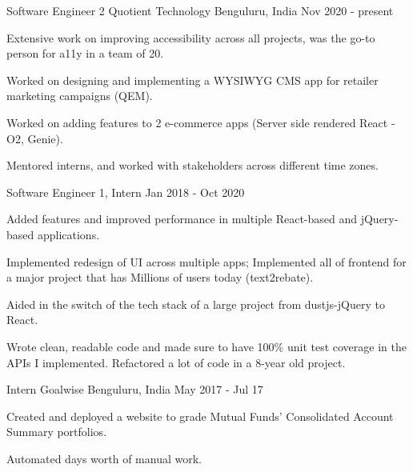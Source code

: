
\begin{cventries}
	\cventrytwopositions
	{Software Engineer 2}
	{Quotient Technology}
	{Benguluru, India}
	{Nov 2020 - present}
	{
		\begin{cvitems}
			\item {Extensive work on improving accessibility across all projects, was the go-to person for a11y in a team of 20.}
			\item {Worked on designing and implementing a WYSIWYG CMS app for retailer marketing campaigns (QEM).}
			\item {Worked on adding features to 2 e-commerce apps (Server side rendered React - O2, Genie).}
			\item {Mentored interns, and worked with stakeholders across different time zones.}
		\end{cvitems}
	}
	{Software Engineer 1, Intern}
	{Jan 2018 - Oct 2020}
	{
		\begin{cvitems}
			\item {Added features and improved performance in multiple React-based and jQuery-based applications.}
			\item {Implemented redesign of UI across multiple apps; Implemented all of frontend for a major project that has Millions of users today (text2rebate).}
			\item {Aided in the switch of the tech stack of a large project from dustjs-jQuery to React.}
			\item {Wrote clean, readable code and made sure to have 100\% unit test coverage in the APIs I implemented. Refactored a lot of code in a 8-year old project.}
		\end{cvitems}
	}
	    
	\cventry
	{Intern}
	{Goalwise}
	{Benguluru, India}
	{May 2017 - Jul 17}
	{
		\begin{cvitems}
			\item {Created and deployed a website to grade Mutual Funds’ Consolidated Account Summary portfolios.}
			\item {Automated days worth of manual work.}
		\end{cvitems}
	}
\end{cventries}